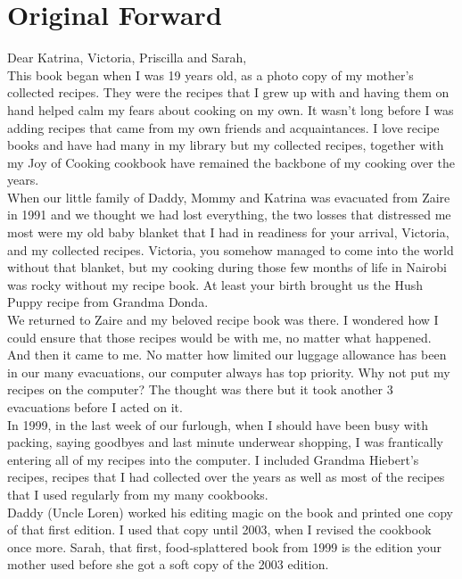 \documentclass[10pt]{memoir} %
\begin{document}
\chapter*{Original Forward} %
\thispagestyle{empty}
Dear Katrina, Victoria, Priscilla and Sarah, \\[10pt]
This book began when I was 19 years old, as a photo copy of my mother's collected recipes. They were the recipes that I grew up with and having them on hand helped calm my fears about cooking on my own. It wasn't long before I was adding recipes that came from my own friends and acquaintances. I love recipe books and have had many in my library but my collected recipes, together with my Joy of Cooking cookbook have remained the backbone of my cooking over the years. \\[10pt]
When our little family of Daddy, Mommy and Katrina was evacuated from Zaire in 1991 and we thought we had lost everything, the two losses that distressed me most were my old baby blanket that I had in readiness for your arrival, Victoria, and my collected recipes. Victoria, you somehow managed to come into the world without that blanket, but my cooking during those few months of life in Nairobi was rocky without my recipe book. At least your birth brought us the Hush Puppy recipe from Grandma Donda. \\[10pt]
We returned to Zaire and my beloved recipe book was there. I wondered how I could ensure that those recipes would be with me, no matter what happened. And then it came to me. No matter how limited our luggage allowance has been in our many evacuations, our computer always has top priority. Why not put my recipes on the computer? The thought was there but it took another 3 evacuations before I acted on it. \\[10pt]
In 1999, in the last week of our furlough, when I should have been busy with   packing, saying goodbyes and last minute underwear shopping, I was frantically entering all of my recipes into the computer. I included Grandma Hiebert's recipes, recipes that I had collected over the years as well as most of the recipes that I used regularly from my many cookbooks. \\[10pt]
Daddy (Uncle Loren) worked his editing magic on the book and printed one copy of that first edition. I used that copy until 2003, when I revised the cookbook once more. Sarah, that first, food-splattered book from 1999 is the edition your mother used before she got a soft copy of the 2003 edition. \\[10pt]
\end{document}
